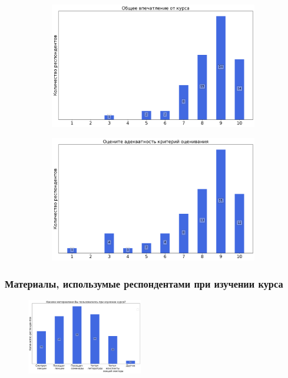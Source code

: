 		\begin{figure}[H]
			\centering
			\begin{subfigure}[b]{0.45\textwidth}
				\centering
				\includegraphics[width=\textwidth]{images/1 course/Аналитическая геометрия/general-0.png}
			\end{subfigure}
			\begin{subfigure}[b]{0.45\textwidth}
				\centering
				\includegraphics[width=\textwidth]{images/1 course/Аналитическая геометрия/general-1.png}
			\end{subfigure}	
		\end{figure}

	\subsubsection{Материалы, использумые респондентами при изучении курса}

		\begin{figure}[H]
			\centering
			\includegraphics[width = 0.45\textwidth]{images/1 course/Аналитическая геометрия/materials.png}
		\end{figure}

